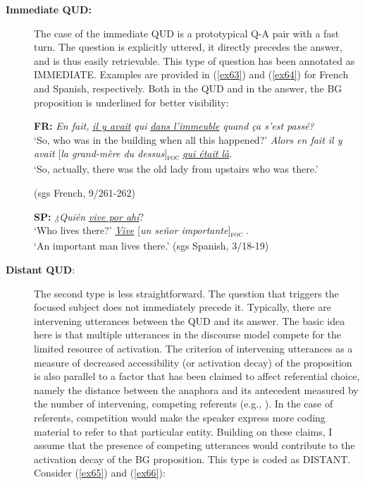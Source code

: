 \begin{description}
\item[\textbf{Immediate QUD:}] The case of the immediate QUD is a prototypical Q-A pair with a fast turn. The question is explicitly uttered, it directly precedes the answer, and is thus easily retrievable. This type of question has been annotated as {\selectfont IMMEDIATE}. Examples are provided in (\ref{ex63}) and (\ref{ex64}) for French and Spanish, respectively. Both in the QUD and in the answer, the BG proposition is underlined for better visibility:

 \ea\label{ex63} \textbf{FR:}
\ea \textit{ En fait,} \uline{\textit{il y avait}} \textit{qui} \uline{\textit{dans l'immeuble}} \textit{quand ça s'est passé?}\\
 ‘So, who was in the building when all this happened?'
\ex \textit{Alors en fait il y avait} {[\textit{la grand-mère du dessus}]\textsubscript{\textsc{foc}}} \normalsize \uline{\textit{qui était là}}.\\
‘So, actually, there was the old lady from upstairs who was there.' 

\hfill (sgs French, 9/261-262)   
\z \z

\ea \label{ex64} \textbf{SP:}
\ea 	\textit{¿Quién} \uline{\textit{vive por ahí}}?\\
 ‘Who lives there?'
\ex  \uline{\textit{Vive}} {[\textit{un señor importante}]\textsubscript{\textsc{foc}}} \normalsize.\\
‘An important man lives there.' \hfill (sgs Spanish, 3/18-19)    
\z \z


\item[\textbf{Distant QUD}:] The second type is less straightforward. The question that triggers the focused subject does not immediately precede it. Typically, there are intervening utterances between the QUD and its answer. The basic idea here is that multiple utterances in the discourse model compete for the limited resource of activation. The criterion of intervening utterances as a measure of decreased accessibility (or activation decay) of the proposition is also parallel to a factor that has been claimed to affect referential choice, namely the distance between the anaphora and its antecedent measured by the number of intervening, competing referents (e.g., \cite{arnold2007effect}).
In the case of referents, competition would make the speaker express more coding material to refer to that particular entity. Building on these claims, I assume that the presence of competing utterances would contribute to the activation decay of the BG proposition. This type is coded as {\selectfont DISTANT}. Consider (\ref{ex65}) and (\ref{ex66}): 


\end{description}
